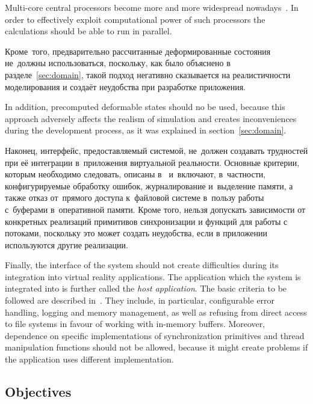 \documentclass[a4paper, 12pt, titlepage]{extarticle}
\begin{document}
    Multi-core central processors become more and more widespread nowadays~\cite{steam-hardware}. In
    order to effectively exploit computational power of such processors the calculations should be
    able to run in parallel.

\begin{original}
    Кроме~того, предварительно рассчитанные деформированные состояния не~должны использоваться,
    поскольку, как было объяснено в разделе~\ref{sec:domain}, такой подход негативно сказывается на реалистичности
    моделирования и создаёт неудобства при разработке приложения.
\end{original}

    In addition, precomputed deformable states should no be used, because this approach adversely
    affects the realism of simulation and creates inconveniences during the development process, as
    it was explained in section~\ref{sec:domain}.

\begin{original}
    Наконец, интерфейс, предоставляемый системой, не~должен создавать трудностей при её интеграции
    в~приложения виртуальной реальности. Основные критерии, которым необходимо следовать,
    описаны в~\cite{gems-middleware} и~включают, в~частности, конфигурируемые обработку ошибок,
    журналирование и~выделение памяти, а также отказ от~прямого доступа к~файловой системе в~пользу
    работы с~буферами в~оперативной памяти. Кроме того, нельзя допускать зависимости от конкретных
    реализаций примитивов синхронизации и функций для работы с потоками, поскольку это может создать
    неудобства, если в приложении используются другие реализации.
\end{original}

    Finally, the interface of the system should not create difficulties during its integration into
    virtual reality applications. The application which the system is integrated into is further called
    the \emph{host application}. The basic criteria to be followed are described in~\cite{gems-middleware}.
    They include, in particular, configurable error handling, logging and memory management, as well
    as refusing from direct access to file systems in favour of working with in-memory buffers.
    Moreover, dependence on specific implementations of synchronization primitives and thread
    manipulation functions should not be allowed, because it might create problems if the
    application uses different implementation.

    \subsection{Objectives}
\end{document}

